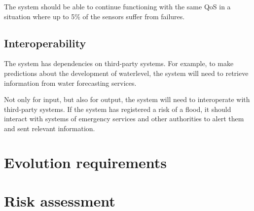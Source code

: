 The system should be able to continue functioning with the same QoS in a situation where up to 5\% of the sensors suffer from failures.  %

\subsection{Interoperability}
The system has dependencies on third-party systems. For example, to make predictions about the development of waterlevel, the system will need to retrieve information from water forecasting services. 

Not only for input, but also for output, the system will need to interoperate with third-party systems. If the system has registered a risk of a flood, it should interact with systems of emergency services and other authorities to alert them and sent relevant information.





\section{Evolution requirements}
\section{Risk assessment}


